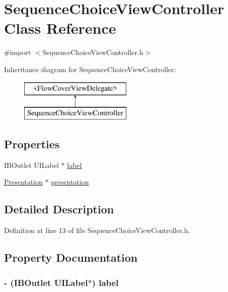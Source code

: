 \hypertarget{interface_sequence_choice_view_controller}{
\section{SequenceChoiceViewController Class Reference}
\label{interface_sequence_choice_view_controller}
}


{\ttfamily \#import $<$SequenceChoiceViewController.h$>$}

Inheritance diagram for SequenceChoiceViewController:\begin{figure}[H]
\begin{center}
\leavevmode
\includegraphics[height=2.000000cm]{interface_sequence_choice_view_controller}
\end{center}
\end{figure}
\subsection*{Properties}
\begin{DoxyCompactItemize}
\item 
IBOutlet UILabel $\ast$ \hyperlink{interface_sequence_choice_view_controller_a729dc1b9adc6098142f097c005a990ba}{label}
\item 
\hyperlink{interface_presentation}{Presentation} $\ast$ \hyperlink{interface_sequence_choice_view_controller_a4687fd0668ba32c76160e4d4f1747c12}{presentation}
\end{DoxyCompactItemize}


\subsection{Detailed Description}


Definition at line 13 of file SequenceChoiceViewController.h.



\subsection{Property Documentation}
\hypertarget{interface_sequence_choice_view_controller_a729dc1b9adc6098142f097c005a990ba}{
\subsubsection[{label}]{\setlength{\rightskip}{0pt plus 5cm}-\/ (IBOutlet UILabel$\ast$) label}}
\label{interface_sequence_choice_view_controller_a729dc1b9adc6098142f097c005a990ba}


